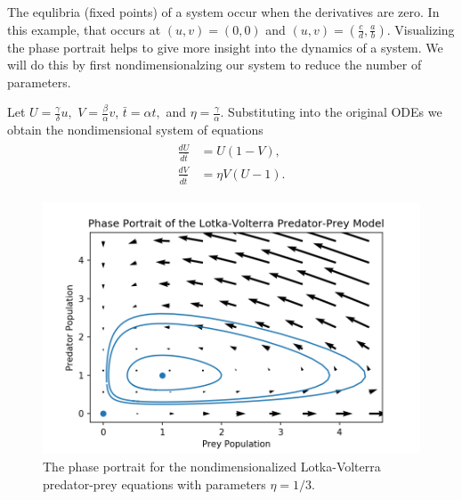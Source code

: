 The equlibria (fixed points) of a system occur when the derivatives are zero.
In this example, that occurs at $(u,v)=(0,0)$ and $(u,v)=(\frac{c}{d},\frac{a}{b})$.
Visualizing the phase portrait helps to give more insight into the dynamics of a system. We will do this by first nondimensionalzing our system to reduce the number of parameters.

Let $U = \frac{\gamma}{\delta}u,$ $V = \frac{\beta}{\alpha}v$, $\bar{t} = \alpha t,$ and $\eta = \frac{\gamma}{\alpha}$.
Substituting into the original ODEs we obtain the nondimensional system of equations
\begin{align}
	\begin{split}
	\frac{dU}{d\bar{t}} &= U(1-V),\\
	\frac{dV}{d\bar{t}} &= \eta V (U-1).
	\end{split}\label{lotka_volterra}
\end{align}



\begin{figure}[H]
\centering
\includegraphics[width=\textwidth]{figures/LV_Phase_Portrait.png}
\caption{The phase portrait for the nondimensionalized Lotka-Volterra predator-prey equations with parameters $\eta = 1/3$.
 }
\label{fig: lotka-phase}
\end{figure}

